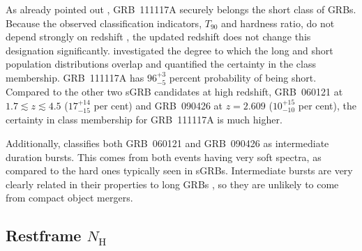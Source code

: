 \documentclass{aa}    %
\begin{document}
As already pointed out \citep{Margutti2012, Sakamoto2013}, GRB~111117A securely 
belongs the short class of GRBs. Because the observed classification
indicators, $T_{90}$ and hardness ratio, do not depend strongly on redshift
\citep{Littlejohns2013a}, the updated redshift does not change this designation
significantly. 
\citet{Bromberg2013} investigated the degree to which the
long and short population distributions overlap and quantified the certainty in
the class membership. GRB~111117A has $96_{-5}^{+3}$ percent probability of
being short. Compared to the other two sGRB candidates at high redshift, GRB~060121
\citep{DeUgartePostigo2006, Levan2006} at $1.7 \lesssim z \lesssim 4.5$
($17_{-15}^{+14}$ per cent) and GRB~090426 \citep{Antonelli2009, Levesque2010,
	Thone2011} at $z = 2.609$ ($10_{-10}^{+15}$ per cent), the certainty in class
membership for GRB~111117A is much higher.

Additionally, \citet{Horvath2010} classifies both GRB~060121 and GRB~090426 as
intermediate duration bursts. This comes from both events having very soft
spectra, as compared to the hard ones typically seen in sGRBs. Intermediate
bursts are very clearly related in their properties to long GRBs
\citep{DeUgartePostigo2011}, so they are unlikely to come from compact object
mergers.


\subsection{Restframe $N_\mathrm{H}$} \label{restnH}
\end{document}
